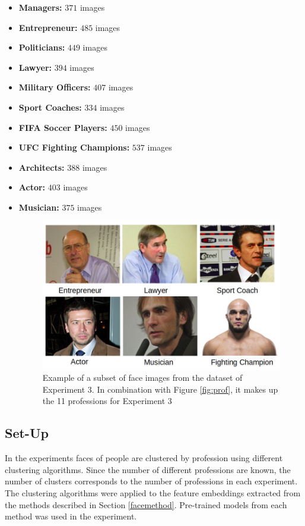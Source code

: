 \documentclass[12pt,english]{article}
\begin{document}
\begin{itemize}
\item \textbf{Managers: } $371$ images
\item \textbf{Entrepreneur: } $485$ images
\item \textbf{Politicians: } $449$ images
\item \textbf{Lawyer: } $394$ images
\item \textbf{Military Officers: } $407$ images
\item \textbf{Sport Coaches: } $334$ images
\item \textbf{FIFA Soccer Players: } $450$ images
\item \textbf{UFC Fighting Champions: } $537$ images
\item \textbf{Architects: } $388$ images
\item \textbf{Actor: } $403$ images
\item \textbf{Musician: } $375$ images

\begin{figure}[!tbp]
 \centering
    \includegraphics[width=0.7\columnwidth]{figures/ex3.png}
    \caption{Example of a subset of face images from the dataset of Experiment 3. In combination with Figure \ref{fig:prof}, it makes up the 11 professions for Experiment 3}
\end{figure}

\end{itemize}


\subsection{Set-Up}
\quad
In the experiments faces of people are clustered by profession using different clustering algorithms. Since the number of different professions are known, the number of clusters corresponds to the number of professions in each experiment. The clustering algorithms were applied to the feature embeddings extracted from the methods described in Section \ref{facemethod}. Pre-trained models from each method was used in the experiment. 
\end{document}
